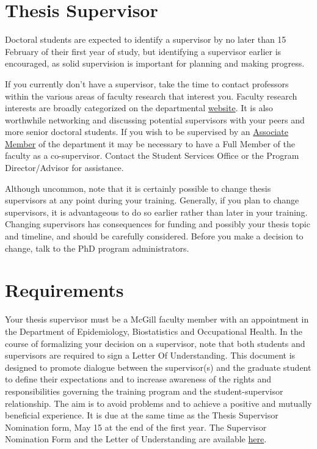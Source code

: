 \documentclass[
  openany]{book}
\begin{document}
\hypertarget{thesis-supervisor}{%
\section{Thesis Supervisor}\label{thesis-supervisor}}

Doctoral students are expected to identify a supervisor by no later than 15 February of their first year of study, but identifying a supervisor earlier is encouraged, as solid supervision is important for planning and making progress.

If you currently don't have a supervisor, take the time to contact professors within the various areas of faculty research that interest you. Faculty research interests are broadly categorized on the departmental \href{https://www.mcgill.ca/epi-biostat-occh/research}{website}. It is also worthwhile networking and discussing potential supervisors with your peers and more senior doctoral students. If you wish to be supervised by an \href{https://www.mcgill.ca/epi-biostat-occh/people/field_mprofile_group/Associate\%20Members}{Associate Member} of the department it may be necessary to have a Full Member of the faculty as a co-supervisor. Contact the Student Services Office or the Program Director/Advisor for assistance.

Although uncommon, note that it is certainly possible to change thesis supervisors at any point during your training. Generally, if you plan to change supervisors, it is advantageous to do so earlier rather than later in your training. Changing supervisors has consequences for funding and possibly your thesis topic and timeline, and should be carefully considered. Before you make a decision to change, talk to the PhD program administrators.

\hypertarget{requirements}{%
\section{Requirements}\label{requirements}}

Your thesis supervisor must be a McGill faculty member with an appointment in the Department of Epidemiology, Biostatistics and Occupational Health. In the course of formalizing your decision on a supervisor, note that both students and supervisors are required to sign a Letter Of Understanding. This document is designed to promote dialogue between the supervisor(s) and the graduate student to define their expectations and to increase awareness of the rights and responsibilities governing the training program and the student-supervisor relationship. The aim is to avoid problems and to achieve a positive and mutually beneficial experience. It is due at the same time as the Thesis Supervisor Nomination form, May 15 at the end of the first year. The Supervisor Nomination Form and the Letter of Understanding are available \href{https://www.mcgill.ca/epi-biostat-occh/files/epi-biostat-occh/eboh_supervisor_nomination_form-lou_201909.docx}{here}.
\end{document}

